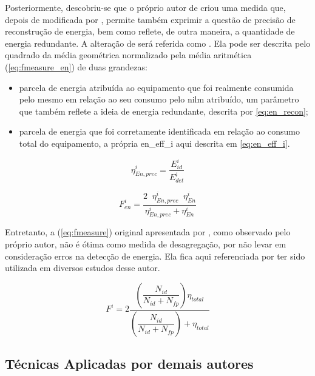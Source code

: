Posteriormente, descobriu-se que o próprio autor de
\cite{nilm_zeifman_review_2011} criou uma medida que, depois de
modificada por \cite{seminilm_fhmm_empiricalnmeter_2013}, permite
também exprimir a questão de precisão de reconstrução de energia, bem
como reflete, de outra maneira, a quantidade de energia redundante.
A alteração de \cite{seminilm_fhmm_empiricalnmeter_2013} será referida
como .
Ela pode ser descrita pelo quadrado da média geométrica normalizado
pela média aritmética (\ref{eq:fmeasure_en}) de duas grandezas:

\begin{itemize}
\item parcela de energia atribuída ao equipamento que foi realmente
consumida pelo mesmo em relação ao seu consumo pelo \gls{nilm}
atribuído, um parâmetro que também reflete a ideia de energia
redundante, descrita por \ref{eq:en_recon};
\item parcela de energia que foi corretamente identificada em relação
ao consumo total do equipamento, a própria \gls{en_eff_i} aqui descrita
em \ref{eq:en_eff_i}.
\end{itemize}

\begin{equation}\label{eq:en_recon}
\eta_{En,prec}^i = \frac{E_{id}^i}{E_{det}^i}
\end{equation}

\begin{equation}\label{eq:fmeasure_en}
F_{en}^i=\frac{2 \;\; \eta_{En,prec}^i \;\; \eta_{En}^i}{\eta_{En,prec}^i+\eta_{En}^i}
\end{equation}

Entretanto, a  (\ref{eq:fmeasure}) original
apresentada por \citet*{nilm_zeifman_vastext_approach_2012}, como
observado pelo próprio autor, não é ótima como medida de desagregação,
por não levar em consideração erros na detecção de energia. Ela fica
aqui referenciada por ter sido utilizada em diversos estudos desse
autor.

\begin{equation}\label{eq:fmeasure}
F^i=2\dfrac{\left(\dfrac{N_{id}}{N_{id}+N_{fp}}\right)\eta_{total}}
{\left(\dfrac{N_{id}}{N_{id}+N_{fp}}\right)+\eta_{total}}
\end{equation}


\subsection{Técnicas Aplicadas por demais autores}
\label{ssec:nilm_tecnicas}

